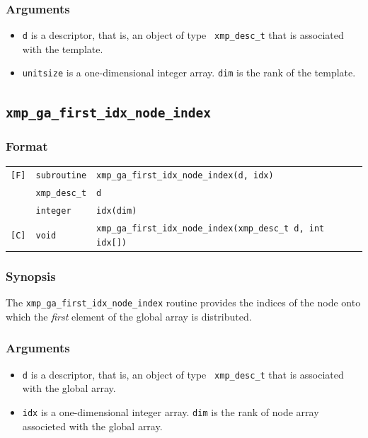 \subsubsection*{Arguments}

\begin{itemize}
 \item {\tt d} is a descriptor, that is, an object of type {\tt
       xmp\_desc\_t} that is associated with the template.
 \item {\tt unitsize} is a one-dimensional integer array. {\tt dim} is
       the rank of the template.
\end{itemize}


\subsection{\tt xmp\_ga\_first\_idx\_node\_index}

\subsubsection*{Format}

\begin{tabular}{lll}

\verb![F]!&  {\tt subroutine}& {\tt xmp\_ga\_first\_idx\_node\_index(d, idx)}\\
          & {\tt xmp\_desc\_t} & {\tt d}\\
          & {\tt integer} & {\tt idx(dim)}\\

\verb![C]!&  {\tt void}& {\tt xmp\_ga\_first\_idx\_node\_index(xmp\_desc\_t d, int idx[])}\\

\end{tabular}

\subsubsection*{Synopsis}

The {\tt xmp\_ga\_first\_idx\_node\_index} routine provides the indices
of the node onto which the {\it first} element of the global array is
distributed.

\subsubsection*{Arguments}

\begin{itemize}
 \item {\tt d} is a descriptor, that is, an object of type {\tt
       xmp\_desc\_t} that is associated with the global array.
 \item {\tt idx} is a one-dimensional integer array. {\tt dim} is the
       rank of node array associeted with the global array.
\end{itemize}


